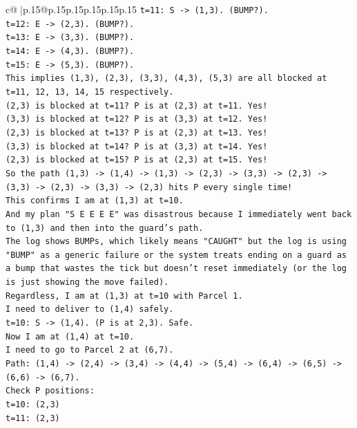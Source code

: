 \documentclass{article}
\begin{document}
{\begin{supertabular}{c@{$\;$}|p{.15\linewidth}@{}p{.15\linewidth}p{.15\linewidth}p{.15\linewidth}p{.15\linewidth}p{.15\linewidth}}
{{{\texttt{t=11: S {-}> (1,3). (BUMP?).} \\
\texttt{t=12: E {-}> (2,3). (BUMP?).} \\
\texttt{t=13: E {-}> (3,3). (BUMP?).} \\
\texttt{t=14: E {-}> (4,3). (BUMP?).} \\
\texttt{t=15: E {-}> (5,3). (BUMP?).} \\
\texttt{This implies (1,3), (2,3), (3,3), (4,3), (5,3) are all blocked at t=11, 12, 13, 14, 15 respectively.} \\
\texttt{(2,3) is blocked at t=11? P is at (2,3) at t=11. Yes!} \\
\texttt{(3,3) is blocked at t=12? P is at (3,3) at t=12. Yes!} \\
\texttt{(2,3) is blocked at t=13? P is at (2,3) at t=13. Yes!} \\
\texttt{(3,3) is blocked at t=14? P is at (3,3) at t=14. Yes!} \\
\texttt{(2,3) is blocked at t=15? P is at (2,3) at t=15. Yes!} \\
\texttt{So the path (1,3) {-}> (1,4) {-}> (1,3) {-}> (2,3) {-}> (3,3) {-}> (2,3) {-}> (3,3) {-}> (2,3) {-}> (3,3) {-}> (2,3) hits P every single time!} \\
\texttt{This confirms I am at (1,3) at t=10.} \\
\texttt{And my plan "S E E E E" was disastrous because I immediately went back to (1,3) and then into the guard's path.} \\
\texttt{The log shows BUMPs, which likely means "CAUGHT" but the log is using "BUMP" as a generic failure or the system treats ending on a guard as a bump that wastes the tick but doesn't reset immediately (or the log is just showing the move failed).} \\
\texttt{Regardless, I am at (1,3) at t=10 with Parcel 1.} \\
\texttt{I need to deliver to (1,4) safely.} \\
\texttt{t=10: S {-}> (1,4). (P is at 2,3). Safe.} \\
\texttt{Now I am at (1,4) at t=10.} \\
\texttt{I need to go to Parcel 2 at (6,7).} \\
\texttt{Path: (1,4) {-}> (2,4) {-}> (3,4) {-}> (4,4) {-}> (5,4) {-}> (6,4) {-}> (6,5) {-}> (6,6) {-}> (6,7).} \\
\texttt{Check P positions:} \\
\texttt{t=10: (2,3)} \\
\texttt{t=11: (2,3)} \\
}}}
\end{supertabular}}
\end{document}
